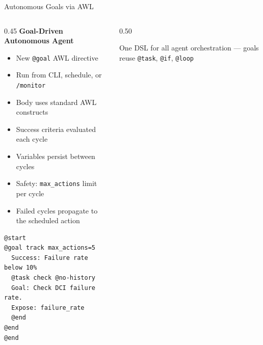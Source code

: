 \documentclass[aspectratio=169,10pt]{beamer}
\begin{document}
\begin{frame}[fragile]{Autonomous Goals via AWL}
\begin{columns}[T]
\begin{column}{0.45\textwidth}
\textbf{Goal-Driven Autonomous Agent}
\begin{itemize}\scriptsize\setlength{\itemsep}{1pt}
  \item New \texttt{@goal} AWL directive
  \item Run from CLI, schedule, or \texttt{/monitor}
  \item Body uses standard AWL constructs
  \item \alert{Success criteria} evaluated each cycle
  \item Variables \alert{persist between cycles}
  \item Safety: \texttt{max\_actions} limit per cycle
  \item Failed cycles propagate to the scheduled action
\end{itemize}

\smallskip
\begin{lstlisting}[style=code,basicstyle=\ttfamily\tiny,title={\scriptsize goals/track\_failures.awl}]
@start
@goal track max_actions=5
  Success: Failure rate below 10%
  @task check @no-history
  Goal: Check DCI failure rate.
  Expose: failure_rate
  @end
@end
@end
\end{lstlisting}
\end{column}
\begin{column}{0.50\textwidth}
\centering
{}

\smallskip
{\scriptsize\color{gray}
One DSL for all agent orchestration --- goals reuse \texttt{@task}, \texttt{@if}, \texttt{@loop}}
\end{column}
\end{columns}
\end{frame}
\end{document}
